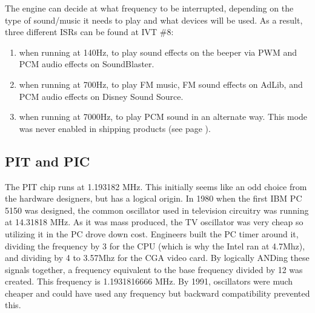 \par
The engine can decide at what frequency to be interrupted, depending on the type of sound/music it needs to play and what devices will be used. As a result, three different ISRs can be found at IVT \#8: 
\begin{enumerate}
\item {} when running at 140Hz, to play sound effects on the beeper via PWM and PCM audio effects on SoundBlaster.
\item {} when running at 700Hz, to play FM music, FM sound effects on AdLib, and PCM audio effects on Disney Sound Source.
\item {} when running at 7000Hz, to play PCM sound in an alternate way. This mode was never enabled in shipping products (see page \pageref{pcs_pcm}).
\end{enumerate}
\par



\subsection{PIT and PIC}
The PIT chip runs at 1.193182 MHz. This initially seems like an odd choice from the hardware designers, but has a logical origin. In 1980 when the first IBM PC 5150 was designed, the common oscillator used in television circuitry was running at 14.31818 MHz. As it was mass produced, the TV oscillator was very cheap so utilizing it in the PC drove down cost. Engineers built the PC timer around it, dividing the frequency by 3 for the CPU (which is why the Intel ran at 4.7Mhz), and dividing by 4 to 3.57Mhz for the CGA video card. By logically ANDing these signals together, a frequency equivalent to the base frequency divided by 12 was created. This frequency is 1.1931816666 MHz. By 1991, oscillators were much cheaper and could have used any frequency but backward compatibility prevented this.\\
\par














